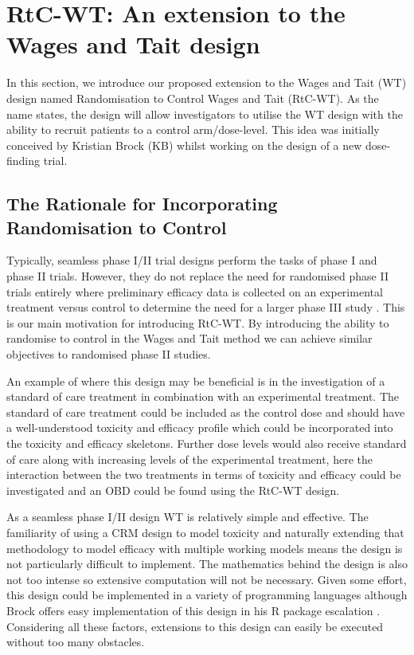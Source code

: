 \section{RtC-WT: An extension to the Wages and Tait design}
\label{WT:RtC-WT}

In this section, we introduce our proposed extension to the Wages and Tait (WT) design named Randomisation to Control Wages and Tait (RtC-WT). As the name states, the design will allow investigators to utilise the WT design with the ability to recruit patients to a control arm/dose-level. This idea was initially conceived by Kristian Brock (KB) whilst working on the design of a new dose-finding trial.  

\subsection{The Rationale for Incorporating Randomisation to Control}
\label{WT:Rationale-for-RtC-WT}

Typically, seamless phase \RN{1}/\RN{2} trial designs perform the tasks of phase \RN{1} and phase \RN{2} trials. However, they do not replace the need for randomised phase \RN{2} trials entirely where preliminary efficacy data is collected on an experimental treatment versus control to determine the need for a larger phase \RN{3} study \cite{yinClinicalTrialDesign2012}. This is our main motivation for introducing RtC-WT. By introducing the ability to randomise to control in the Wages and Tait method we can achieve similar objectives to randomised phase \RN{2} studies. 

An example of where this design may be beneficial is in the investigation of a standard of care treatment in combination with an experimental treatment. The standard of care treatment could be included as the control dose and should have a well-understood toxicity and efficacy profile which could be incorporated into the toxicity and efficacy skeletons. Further dose levels would also receive standard of care along with increasing levels of the experimental treatment, here the interaction between the two treatments in terms of toxicity and efficacy could be investigated and an OBD could be found using the RtC-WT design. 

As a seamless phase \RN{1}/\RN{2} design WT is relatively simple and effective. The familiarity of using a CRM design to model toxicity and naturally extending that methodology to model efficacy with multiple working models means the design is not particularly difficult to implement. The mathematics behind the design is also not too intense so extensive computation will not be necessary. Given some effort, this design could be implemented in a variety of programming languages although Brock offers easy implementation of this design in his R package escalation \cite{brockModularApproachDose2020}. Considering all these factors, extensions to this design can easily be executed without too many obstacles.


